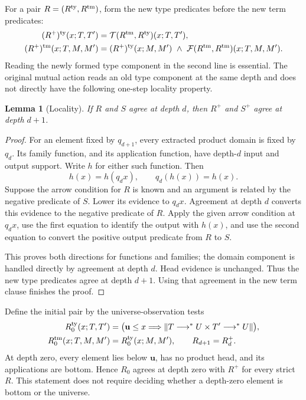 \documentclass[11pt,a4paper]{article}
\newtheorem{lemma}[theorem]{Lemma}
\theoremstyle{definition}
\theoremstyle{remark}
\newcommand{\trunc}[1]{\left\lVert #1\right\rVert}
\begin{document}
For a pair $R=(R^{\rm ty},R^{\rm tm})$, form the new type predicates
before the new term predicates:
\begin{equation}\label{eq:advance}
\begin{aligned}
 (R^+)^{\rm ty}(x;T,T')
  &=\mathcal T(R^{\rm tm},R^{\rm ty})(x;T,T'),\\
 (R^+)^{\rm tm}(x;T,M,M')
  &=(R^+)^{\rm ty}(x;M,M')\ \wedge\
    \mathcal F(R^{\rm tm},R^{\rm tm})(x;T,M,M').
\end{aligned}
\end{equation}
Reading the newly formed type component in the second line is essential.
The original mutual action reads an old type component at the same depth
and does not directly have the following one-step locality property.

\begin{lemma}[Locality]\label{lem:relation-locality}
If $R$ and $S$ agree at depth $d$, then $R^+$ and $S^+$ agree at
depth $d+1$.
\end{lemma}
\begin{proof}
For an element fixed by $q_{d+1}$, every extracted product domain is
fixed by $q_d$. Its family function, and its application function, have
depth-$d$ input and output support. Write $h$ for either such function.
Then
\[
 h(x)=h(q_dx),\qquad q_d(h(x))=h(x).
\]
Suppose the arrow condition for $R$ is known and an argument is related
by the negative predicate of $S$. Lower its evidence to $q_dx$.
Agreement at depth $d$ converts this evidence to the negative predicate
of $R$. Apply the given arrow condition at $q_dx$, use the first equation
to identify the output with $h(x)$, and use the second equation to
convert the positive output predicate from $R$ to $S$.

This proves both directions for functions and families; the domain
component is handled directly by agreement at depth $d$. Head evidence
is unchanged. Thus the new type predicates agree at depth $d+1$.
Using that agreement in the new term clause finishes the proof.
\end{proof}

Define the initial pair by the universe-observation tests
\[
\begin{aligned}
 R_0^{\rm ty}(x;T,T')&=
  \bigl(\mathbf u\leq x\Longrightarrow
    \trunc{T\longrightarrow^*U\mathbin{\times}T'\longrightarrow^*U}\bigr),\\
 R_0^{\rm tm}(x;T,M,M')&=R_0^{\rm ty}(x;M,M'),
 \qquad R_{d+1}=R_d^+.
\end{aligned}
\]
At depth zero, every element lies below $\mathbf u$, has no product head,
and its applications are bottom. Hence $R_0$ agrees at depth zero with
$R^+$ for every strict $R$. This statement does not require deciding
whether a depth-zero element is bottom or the universe.
\end{document}
